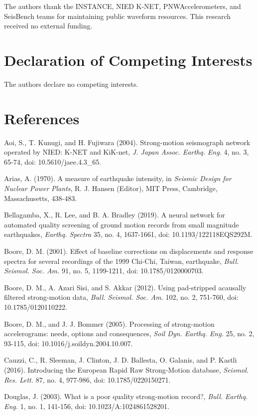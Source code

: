 \documentclass[12pt,letterpaper]{article}
\begin{document}
The authors thank the INSTANCE, NIED K-NET, PNWAccelerometers, and SeisBench teams for maintaining public waveform resources. This research received no external funding.

\section{Declaration of Competing Interests}\label{declaration-of-competing-interests}

The authors declare no competing interests.

\section{References}\label{references}

Aoi, S., T. Kunugi, and H. Fujiwara (2004). Strong-motion seismograph network operated by NIED: K-NET and KiK-net, \emph{J. Japan Assoc. Earthq. Eng.} 4, no. 3, 65-74, doi: 10.5610/jaee.4.3\_65.

Arias, A. (1970). A measure of earthquake intensity, in \emph{Seismic Design for Nuclear Power Plants}, R. J. Hansen (Editor), MIT Press, Cambridge, Massachusetts, 438-483.

Bellagamba, X., R. Lee, and B. A. Bradley (2019). A neural network for automated quality screening of ground motion records from small magnitude earthquakes, \emph{Earthq. Spectra} 35, no. 4, 1637-1661, doi: 10.1193/122118EQS292M.

Boore, D. M. (2001). Effect of baseline corrections on displacements and response spectra for several recordings of the 1999 Chi-Chi, Taiwan, earthquake, \emph{Bull. Seismol. Soc. Am.} 91, no. 5, 1199-1211, doi: 10.1785/0120000703.

Boore, D. M., A. Azari Sisi, and S. Akkar (2012). Using pad-stripped acausally filtered strong-motion data, \emph{Bull. Seismol. Soc. Am.} 102, no. 2, 751-760, doi: 10.1785/0120110222.

Boore, D. M., and J. J. Bommer (2005). Processing of strong-motion accelerograms: needs, options and consequences, \emph{Soil Dyn. Earthq. Eng.} 25, no. 2, 93-115, doi: 10.1016/j.soildyn.2004.10.007.

Cauzzi, C., R. Sleeman, J. Clinton, J. D. Ballesta, O. Galanis, and P. Kastli (2016). Introducing the European Rapid Raw Strong-Motion database, \emph{Seismol. Res. Lett.} 87, no. 4, 977-986, doi: 10.1785/0220150271.

Douglas, J. (2003). What is a poor quality strong-motion record?, \emph{Bull. Earthq. Eng.} 1, no. 1, 141-156, doi: 10.1023/A:1024861528201.
\end{document}

